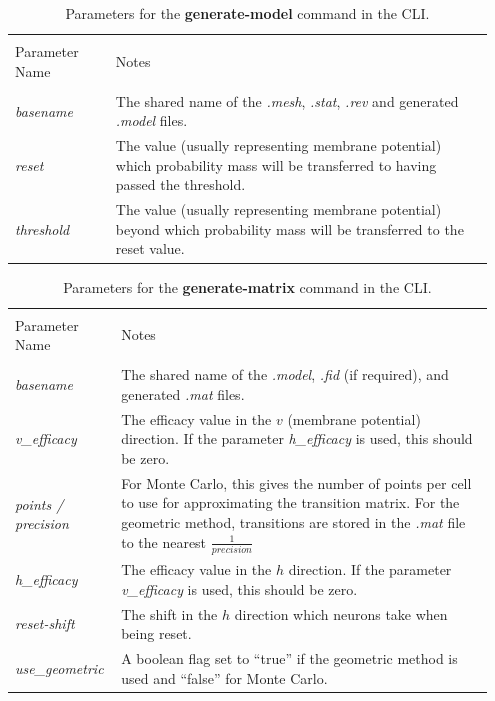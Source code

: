 \documentclass[utf8]{frontiersSCNS} %
\begin{document}
\begin{table}[ht!]
\caption{Parameters for the \textbf{generate-model} command in the CLI.}
    \centering
    \begin{tabular}{|p{0.2\linewidth} | p{0.75\linewidth}|}
    \hline
    &\\
    Parameter Name & Notes \\
    \hline
    &\\
    \textit{basename} & The shared name of the \textit{.mesh}, \textit{.stat}, \textit{.rev} and generated \textit{.model} files.\\
    \textit{reset} & The value (usually representing membrane potential) which probability mass will be transferred to having passed the threshold.\\
    \textit{threshold} & The value (usually representing membrane potential) beyond which probability mass will be transferred to the reset value.\\
    \hline
    \end{tabular}
\label{tab:generatemodel}
\end{table}

\begin{table}[ht!]
\caption{Parameters for the \textbf{generate-matrix} command in the CLI.}
    \centering
    \begin{tabular}{|p{0.2\linewidth} | p{0.75\linewidth}|}
    \hline
    &\\
    Parameter Name & Notes \\
    \hline
    &\\
    \textit{basename} & The shared name of the \textit{.model}, \textit{.fid} (if required), and generated \textit{.mat} files.\\
    \textit{v\_efficacy} & The efficacy value in the $v$ (membrane potential) direction. If the parameter \textit{h\_efficacy} is used, this should be zero.\\
    \textit{points / precision} & For Monte Carlo, this gives the number of points per cell to use for approximating the transition matrix. For the geometric method, transitions are stored in the \textit{.mat} file to the nearest $\frac{1}{precision}$\\
    \textit{h\_efficacy} & The efficacy value in the $h$ direction. If the parameter \textit{v\_efficacy} is used, this should be zero.\\
    \textit{reset-shift} & The shift in the $h$ direction which neurons take when being reset. \\
    \textit{use\_geometric} & A boolean flag set to ``true'' if the geometric method is used and ``false'' for Monte Carlo. \\
    \hline
    \end{tabular}
\label{tab:generatematrix}
\end{table}
\end{document}

